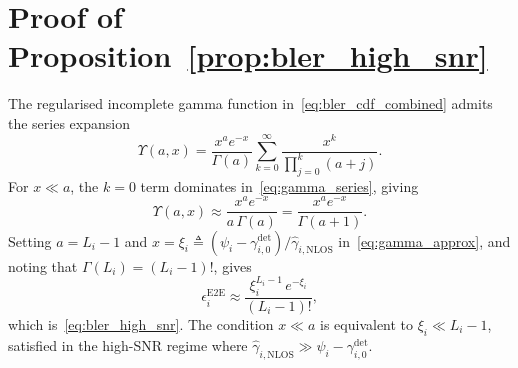 \documentclass[journal]{IEEEtran}
\begin{document}
\section{Proof of Proposition~\ref{prop:bler_high_snr}}
\label{app:proof_bler_high_snr}
The regularised incomplete gamma function in~\eqref{eq:bler_cdf_combined} admits the series expansion
\begin{equation}
\Upsilon(a,x)=\frac{x^a e^{-x}}{\Gamma(a)}\sum_{k=0}^{\infty}\frac{x^k}{\prod_{j=0}^{k}(a+j)}.
\label{eq:gamma_series}
\end{equation}
For $x\ll a$, the $k=0$ term dominates in~\eqref{eq:gamma_series}, giving
\begin{equation}
\Upsilon(a,x)\approx\frac{x^a e^{-x}}{a\,\Gamma(a)}=\frac{x^a e^{-x}}{\Gamma(a+1)}.
\label{eq:gamma_approx}
\end{equation}
Setting $a=L_i-1$ and $x=\xi_i\triangleq(\psi_i-\gamma_{i,0}^{\mathrm{det}})/\hat{\gamma}_{i,\mathrm{NLOS}}$ in~\eqref{eq:gamma_approx}, and noting that $\Gamma(L_i)=(L_i-1)!$, gives
\begin{equation}
\epsilon_i^{\mathrm{E2E}}\approx\frac{\xi_i^{L_i-1}\,e^{-\xi_i}}{(L_i-1)!},
\end{equation}
which is~\eqref{eq:bler_high_snr}. The condition $x\ll a$ is equivalent to $\xi_i\ll L_i-1$, satisfied in the high-SNR regime where $\hat{\gamma}_{i,\mathrm{NLOS}}\gg\psi_i-\gamma_{i,0}^{\mathrm{det}}$.
\end{document}
